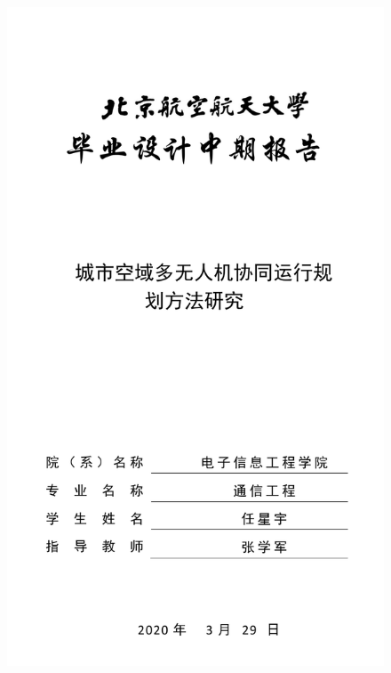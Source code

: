 \documentclass[UTF8,a4paper]{ctexart}
\begin{document}
\begin{figure}[ht]
    \centering
    \includegraphics{titlepage.png}
\end{figure}
\thispagestyle{empty}
\newpage


\tableofcontents
\thispagestyle{empty}
\newpage
\end{document}
